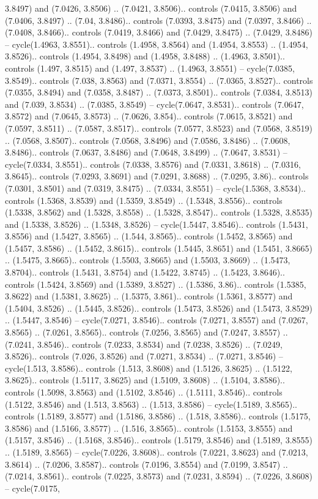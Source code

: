 3.8497) and (7.0426, 3.8506) .. (7.0421, 3.8506).. controls (7.0415, 3.8506) and (7.0406, 3.8497) .. (7.04, 3.8486).. controls (7.0393, 3.8475) and (7.0397, 3.8466) .. (7.0408, 3.8466).. controls (7.0419, 3.8466) and (7.0429, 3.8475) .. (7.0429, 3.8486) -- cycle(1.4963, 3.8551).. controls (1.4958, 3.8564) and (1.4954, 3.8553) .. (1.4954, 3.8526).. controls (1.4954, 3.8498) and (1.4958, 3.8488) .. (1.4963, 3.8501).. controls (1.497, 3.8515) and (1.497, 3.8537) .. (1.4963, 3.8551) -- cycle(7.0385, 3.8549).. controls (7.038, 3.8563) and (7.0371, 3.8554) .. (7.0365, 3.8527).. controls (7.0355, 3.8494) and (7.0358, 3.8487) .. (7.0373, 3.8501).. controls (7.0384, 3.8513) and (7.039, 3.8534) .. (7.0385, 3.8549) -- cycle(7.0647, 3.8531).. controls (7.0647, 3.8572) and (7.0645, 3.8573) .. (7.0626, 3.854).. controls (7.0615, 3.8521) and (7.0597, 3.8511) .. (7.0587, 3.8517).. controls (7.0577, 3.8523) and (7.0568, 3.8519) .. (7.0568, 3.8507).. controls (7.0568, 3.8496) and (7.0586, 3.8486) .. (7.0608, 3.8486).. controls (7.0637, 3.8486) and (7.0648, 3.8499) .. (7.0647, 3.8531) -- cycle(7.0334, 3.8551).. controls (7.0338, 3.8576) and (7.0331, 3.8618) .. (7.0316, 3.8645).. controls (7.0293, 3.8691) and (7.0291, 3.8688) .. (7.0295, 3.86).. controls (7.0301, 3.8501) and (7.0319, 3.8475) .. (7.0334, 3.8551) -- cycle(1.5368, 3.8534).. controls (1.5368, 3.8539) and (1.5359, 3.8549) .. (1.5348, 3.8556).. controls (1.5338, 3.8562) and (1.5328, 3.8558) .. (1.5328, 3.8547).. controls (1.5328, 3.8535) and (1.5338, 3.8526) .. (1.5348, 3.8526) -- cycle(1.5447, 3.8546).. controls (1.5431, 3.8556) and (1.5427, 3.8565) .. (1.544, 3.8565).. controls (1.5452, 3.8565) and (1.5457, 3.8586) .. (1.5452, 3.8615).. controls (1.5445, 3.8651) and (1.5451, 3.8665) .. (1.5475, 3.8665).. controls (1.5503, 3.8665) and (1.5503, 3.8669) .. (1.5473, 3.8704).. controls (1.5431, 3.8754) and (1.5422, 3.8745) .. (1.5423, 3.8646).. controls (1.5424, 3.8569) and (1.5389, 3.8527) .. (1.5386, 3.86).. controls (1.5385, 3.8622) and (1.5381, 3.8625) .. (1.5375, 3.861).. controls (1.5361, 3.8577) and (1.5404, 3.8526) .. (1.5445, 3.8526).. controls (1.5473, 3.8526) and (1.5473, 3.8529) .. (1.5447, 3.8546) -- cycle(7.0271, 3.8546).. controls (7.0271, 3.8557) and (7.0267, 3.8565) .. (7.0261, 3.8565).. controls (7.0256, 3.8565) and (7.0247, 3.8557) .. (7.0241, 3.8546).. controls (7.0233, 3.8534) and (7.0238, 3.8526) .. (7.0249, 3.8526).. controls (7.026, 3.8526) and (7.0271, 3.8534) .. (7.0271, 3.8546) -- cycle(1.513, 3.8586).. controls (1.513, 3.8608) and (1.5126, 3.8625) .. (1.5122, 3.8625).. controls (1.5117, 3.8625) and (1.5109, 3.8608) .. (1.5104, 3.8586).. controls (1.5098, 3.8563) and (1.5102, 3.8546) .. (1.5111, 3.8546).. controls (1.5122, 3.8546) and (1.513, 3.8563) .. (1.513, 3.8586) -- cycle(1.5189, 3.8565).. controls (1.5189, 3.8577) and (1.5186, 3.8586) .. (1.518, 3.8586).. controls (1.5175, 3.8586) and (1.5166, 3.8577) .. (1.516, 3.8565).. controls (1.5153, 3.8555) and (1.5157, 3.8546) .. (1.5168, 3.8546).. controls (1.5179, 3.8546) and (1.5189, 3.8555) .. (1.5189, 3.8565) -- cycle(7.0226, 3.8608).. controls (7.0221, 3.8623) and (7.0213, 3.8614) .. (7.0206, 3.8587).. controls (7.0196, 3.8554) and (7.0199, 3.8547) .. (7.0214, 3.8561).. controls (7.0225, 3.8573) and (7.0231, 3.8594) .. (7.0226, 3.8608) -- cycle(7.0175, 